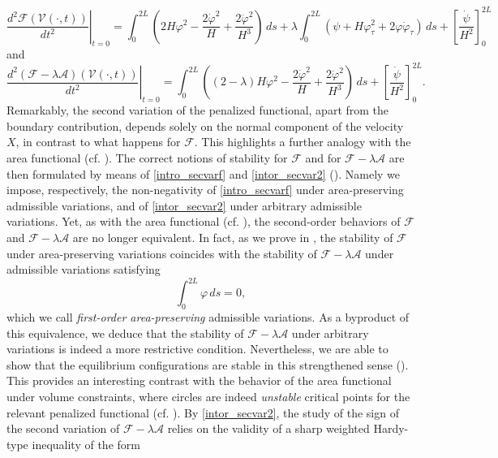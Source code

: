 \documentclass[11pt]{amsart}
\newcommand{\A}{\mathcal A}
\newcommand{\F}{\mathcal F}
\theoremstyle{definition}
\theoremstyle{remark}
\numberwithin{equation}{section}
\begin{document}
	\begin{equation}\label{intro_secvarf}
		\left.\frac{d^2\F(\mathcal V(\cdot,t))}{dt^2}\right|_{t=0}=\int_0^{2L}\left(2H\varphi^2-\frac{2\dot\varphi^2}{H}+\frac{2\ddot\varphi^2}{H^3}\right)\,ds+\lambda\int_0^{2L}\left(\psi+H\varphi_\tau^2+2\varphi\dot\varphi_\tau\right)\,ds+\left[\frac{\dot\psi}{H^2}\right]_{0}^{2L}
	\end{equation}
	and
	\begin{equation}\label{intor_secvar2}
		\left.\frac{d^2(\F-\lambda \A)(\mathcal V(\cdot,t))}{dt^2}\right|_{t=0}=\int_0^{2L}\left((2-\lambda)H\varphi^2-\frac{2\dot\varphi^2}{H}+\frac{2\ddot\varphi^2}{H^3}\right)\,ds+\left[\frac{\dot\psi}{H^2}\right]_{0}^{2L}.
	\end{equation}
	Remarkably, the second variation of the penalized functional, apart from the boundary contribution, depends solely on the normal component of the velocity $X$, in contrast to what happens for $\F$. This highlights a further analogy with the area functional (cf. \cite{MR731682}). The correct notions of stability for $\F$ and for $\F-\lambda\A$ are then formulated by means of \eqref{intro_secvarf} and \eqref{intor_secvar2} (). Namely we impose, respectively, the non-negativity of \eqref{intro_secvarf} under area-preserving admissible variations, and of \eqref{intor_secvar2} under arbitrary admissible variations. Yet, as with the area functional (cf. \cite{MR731682}), the second-order behaviors of $\F$ and 
	$\F-\lambda\A$ are no longer equivalent. In fact, as we prove in , the stability of $\F$ under area-preserving variations coincides with the stability of $\F-\lambda\A$ under admissible variations satisfying 
	\begin{equation*}
		\int_0^{2L}\varphi\,ds=0,
	\end{equation*}
	which we call \emph{first-order area-preserving} admissible variations. As a byproduct of this equivalence, we deduce that the stability of $\F-\lambda\A$ under arbitrary variations is indeed a more restrictive condition. Nevertheless, we are able to show that the equilibrium configurations are stable in this strengthened sense (). This provides an interesting contrast with the behavior of the area functional under volume constraints, where circles are indeed \emph{unstable} critical points for the relevant penalized functional  (cf. \cite{MR731682}).
	By \eqref{intor_secvar2}, the study of the sign of the second variation of $\F-\lambda\A$ relies on the validity of a sharp weighted Hardy-type inequality of the form 
\end{document}
